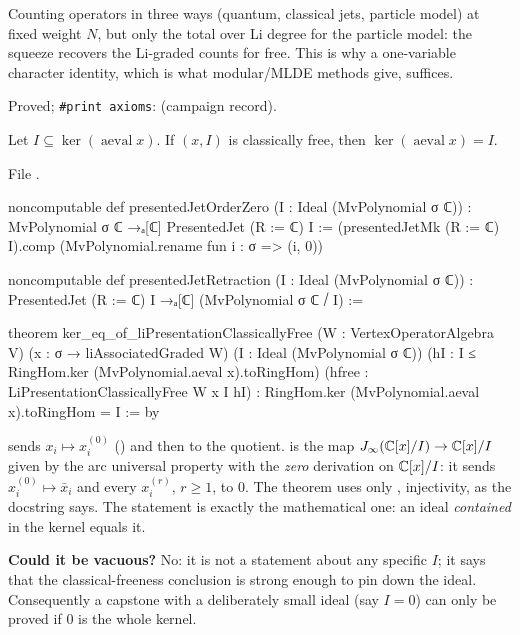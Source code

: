 \begin{physics}
Counting operators in three ways (quantum, classical jets, particle model) at fixed weight $N$, but only
the total over Li degree for the particle model: the squeeze recovers the Li-graded counts for free. This is
why a one-variable character identity, which is what modular/MLDE methods give, suffices.
\end{physics}

\begin{status}
Proved; \texttt{\#print axioms}:  (campaign record).
\end{status}

\begin{theorem}\label{l24:thm:kereq}
Let $I\subseteq\ker(\operatorname{aeval}x)$. If $(x,I)$ is classically free, then $\ker(\operatorname{aeval}x)=I$.
\end{theorem}
\noindent File .
\begin{leancode}
noncomputable def presentedJetOrderZero (I : Ideal (MvPolynomial σ ℂ)) :
    MvPolynomial σ ℂ →ₐ[ℂ] PresentedJet (R := ℂ) I :=
  (presentedJetMk (R := ℂ) I).comp (MvPolynomial.rename fun i : σ => (i, 0))

noncomputable def presentedJetRetraction (I : Ideal (MvPolynomial σ ℂ)) :
    PresentedJet (R := ℂ) I →ₐ[ℂ] (MvPolynomial σ ℂ ⧸ I) :=

theorem ker_eq_of_liPresentationClassicallyFree (W : VertexOperatorAlgebra V)
    (x : σ → liAssociatedGraded W) (I : Ideal (MvPolynomial σ ℂ))
    (hI : I ≤ RingHom.ker (MvPolynomial.aeval x).toRingHom)
    (hfree : LiPresentationClassicallyFree W x I hI) :
    RingHom.ker (MvPolynomial.aeval x).toRingHom = I := by
\end{leancode}

\begin{dictionary}
 sends $x_i\mapsto x_i^{(0)}$ () and then to the
quotient.  is the map $J_\infty({\mathbb{C}}[x]/I)\to{\mathbb{C}}[x]/I$ given by the arc universal
property with the \emph{zero} derivation on ${\mathbb{C}}[x]/I$: it sends $x_i^{(0)}\mapsto\bar x_i$ and every
$x_i^{(r)}$, $r\ge1$, to $0$. The theorem uses only , injectivity, as the docstring says. The
statement is exactly the mathematical one: an ideal \emph{contained} in the kernel equals it.

\textbf{Could it be vacuous?} No: it is not a statement about any specific $I$; it says that the
classical-freeness conclusion is strong enough to pin down the ideal. Consequently a capstone with a
deliberately small ideal (say $I=0$) can only be proved if $0$ is the whole kernel.
\end{dictionary}

